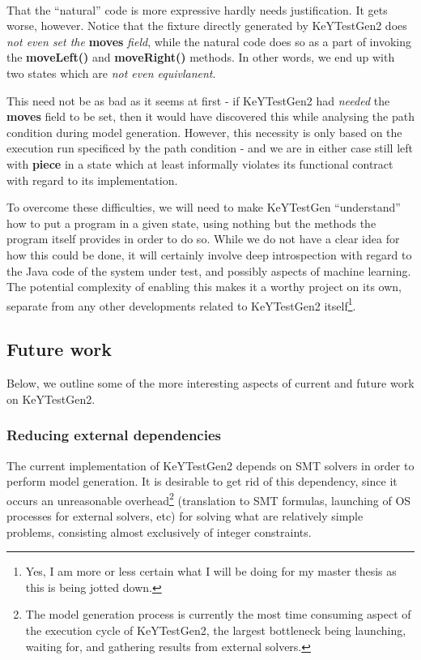 \documentclass{article}
\newcommand{\tmem}[1]{{\em #1\/}}
\newcommand{\tmstrong}[1]{\textbf{#1}}
\begin{document}
\

That the ``natural'' code is more expressive hardly needs justification. It
gets worse, however. Notice that the fixture directly generated by KeYTestGen2
does {\tmem{not even set the}} {\tmstrong{{\tmem{}}moves}} {\tmem{field}},
while the natural code does so as a part of invoking the
{\tmstrong{moveLeft()}} and {\tmstrong{moveRight()}} methods. In other words,
we end up with two states which are {\tmem{not even equivlanent}}.



This need not be as bad as it seems at first - if KeYTestGen2 had
{\tmem{needed}} the {\tmstrong{moves}} field to be set, then it would have
discovered this while analysing the path condition during model generation.
However, this necessity is only based on the execution run specificed by the
path condition - and we are in either case still left with {\tmstrong{piece}}
in a state which at least informally violates its functional contract with
regard to its implementation.



To overcome these difficulties, we will need to make KeYTestGen ``understand''
how to put a program in a given state, using nothing but the methods the
program itself provides in order to do so. While we do not have a clear idea
for how this could be done, it will certainly involve deep introspection with
regard to the Java code of the system under test, and possibly aspects of
machine learning. The potential complexity of enabling this makes it a worthy
project on its own, separate from any other developments related to
KeYTestGen2 itself{\footnote{Yes, I am more or less certain what I will be
doing for my master thesis as this is being jotted down.}}.

\subsection{Future work}

Below, we outline some of the more interesting aspects of current and future
work on KeYTestGen2.



\subsubsection{Reducing external dependencies}

The current implementation of KeYTestGen2 depends on SMT solvers in order to
perform model generation. It is desirable to get rid of this dependency, since
it occurs an unreasonable overhead{\footnote{The model generation process is
currently the most time consuming aspect of the execution cycle of
KeYTestGen2, the largest bottleneck being launching, waiting for, and
gathering results from external solvers.}} (translation to SMT formulas,
launching of OS processes for external solvers, etc) for solving what are
relatively simple problems, consisting almost exclusively of integer
constraints.
\end{document}
